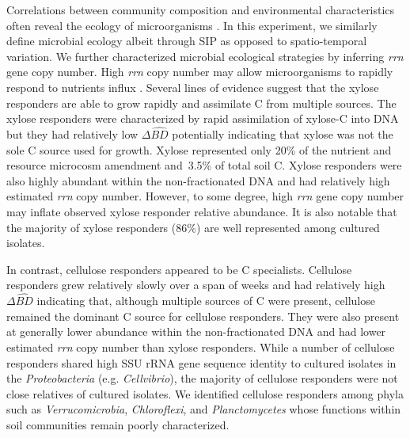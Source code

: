 Correlations between community composition and environmental characteristics
often reveal the ecology of microorganisms \citep{Fierer2007}. In this
experiment, we similarly define microbial ecology albeit through SIP as opposed
to spatio-temporal variation. We further characterized microbial ecological
strategies by inferring \textit{rrn} gene copy number. High
\textit{rrn} copy number may allow microorganisms to rapidly respond to
nutrients influx \citep{Klappenbach_2000}. Several lines of evidence suggest
that the xylose responders are able to grow rapidly and assimilate C from
multiple sources. The xylose responders were characterized by rapid
assimilation of xylose-C into DNA but they had relatively low $\Delta\hat{BD}$
potentially indicating that xylose was not the sole C source used for growth.
Xylose represented only 20\% of the nutrient and resource microcosm amendment
and~3.5\% of total soil C. Xylose responders were also highly abundant within
the non-fractionated DNA and had relatively high estimated \textit{rrn} copy
number. However, to some degree, high \textit{rrn} gene copy number may inflate
observed xylose responder relative abundance. It is also notable that the
majority of xylose responders (86\%) are well represented among cultured
isolates. 

In contrast, cellulose responders appeared to be C specialists.
Cellulose responders grew relatively slowly over a span of weeks and had
relatively high $\Delta\hat{BD}$ indicating that, although multiple sources of
C were present, cellulose remained the dominant C source for cellulose
responders. They were also present at generally lower abundance within the
non-fractionated DNA and had lower estimated \textit{rrn} copy number than
xylose responders. While a number of cellulose responders shared
high SSU rRNA gene sequence identity to cultured isolates in the
\textit{Proteobacteria} (e.g. \textit{Cellvibrio}), the majority of cellulose
responders were not close relatives of cultured isolates. We
identified cellulose responders among phyla such as \textit{Verrucomicrobia},
\textit{Chloroflexi}, and \textit{Planctomycetes} whose functions within soil
communities remain poorly characterized.

